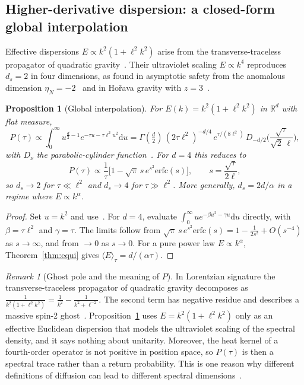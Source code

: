 \documentclass[11pt]{article}
\newtheorem{proposition}{Proposition}[section]
\theoremstyle{remark}\newtheorem*{remark}{Remark}
\newcommand{\dd}{\mathrm{d}}
\newcommand{\RR}{\mathbb{R}}
\begin{document}
\subsection{Higher-derivative dispersion: a closed-form global interpolation}
Effective dispersions $E\propto k^2(1+\ell^2k^2)$ arise from the transverse-traceless propagator of quadratic
gravity~\cite{Stelle}. Their ultraviolet scaling $E\propto k^4$ reproduces $d_s=2$ in four dimensions, as found
in asymptotic safety from the anomalous dimension $\eta_N=-2$~\cite{LauscherReuter} and in Ho\v{r}ava gravity with
$z=3$~\cite{Horava}.

\begin{proposition}[Global interpolation]
\label{prop:stelle}
For $E(k)=k^2(1+\ell^2k^2)$ in $\RR^d$ with flat measure,
\begin{equation}
P(\tau)\propto\int_0^\infty u^{\frac d2-1}e^{-\tau u-\tau\ell^2u^2}\dd u
=\Gamma(\tfrac d2)\,(2\tau\ell^2)^{-d/4}\,e^{\tau/(8\ell^2)}\,D_{-d/2}\!\Big(\frac{\sqrt\tau}{\sqrt2\,\ell}\Big),
\label{eq:pcf}
\end{equation}
with $D_\nu$ the parabolic-cylinder function~\cite{GR}. For $d=4$ this reduces to
\begin{equation}
P(\tau)\propto\frac{1}{\tau}\Big[1-\sqrt\pi\,s\,e^{s^2}\mathrm{erfc}(s)\Big],\qquad s=\frac{\sqrt\tau}{2\ell},
\label{eq:erfc}
\end{equation}
so $d_s\to2$ for $\tau\ll\ell^2$ and $d_s\to4$ for $\tau\gg\ell^2$. More generally, $d_s=2d/\alpha$ in a regime where $E\propto k^\alpha$.
\end{proposition}
\begin{proof}
Set $u=k^2$ and use~\cite[3.462.1]{GR}. For $d=4$, evaluate $\int_0^\infty ue^{-\beta u^2-\gamma u}\dd u$ directly,
with $\beta=\tau\ell^2$ and $\gamma=\tau$. The limits follow from $\sqrt\pi\,s\,e^{s^2}\mathrm{erfc}(s)=1-\frac{1}{2s^2}+O(s^{-4})$ as
$s\to\infty$, and from $\to0$ as $s\to0$. For a pure power law $E\propto k^\alpha$, Theorem~\ref{thm:equi} gives
$\langle E\rangle_\tau=d/(\alpha\tau)$.
\end{proof}
\begin{remark}[Ghost pole and the meaning of $P$]
In Lorentzian signature the transverse-traceless propagator of quadratic gravity decomposes as
$\frac{1}{k^2(1+\ell^2k^2)}=\frac{1}{k^2}-\frac{1}{k^2+\ell^{-2}}$. The second term has negative residue and describes a
massive spin-2 ghost~\cite{Stelle}. Proposition~\ref{prop:stelle} uses $E=k^2(1+\ell^2k^2)$ only as an effective
Euclidean dispersion that models the ultraviolet scaling of the spectral density, and it says nothing about
unitarity. Moreover, the heat kernel of a fourth-order operator is not positive in position space, so $P(\tau)$
is then a spectral trace rather than a return probability. This is one reason why different definitions of
diffusion can lead to different spectral dimensions~\cite{CES}.
\end{remark}
\end{document}
